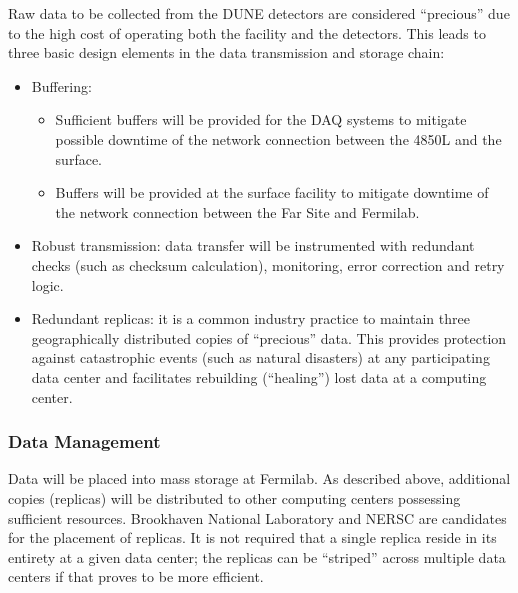 Raw data to be collected from the DUNE detectors are considered ``precious'' due to the high cost of operating both the facility and the detectors. %
This leads to three basic design elements in the data transmission and storage chain:
\begin{itemize}
\item Buffering:
\begin{itemize}
\item Sufficient %
buffers will be provided for the DAQ systems  to mitigate possible downtime of the network connection between the 4850L and the surface.
\item Buffers will be provided at the surface facility to mitigate downtime of the network connection between the Far Site and Fermilab.
\end{itemize}
\item Robust transmission: data transfer will %
be instrumented with redundant checks (such as checksum calculation), monitoring, error correction and retry logic.
\item Redundant replicas: it is a common industry practice to %
maintain three geographically distributed copies of ``precious'' data. %
This provides protection against catastrophic events (such as natural disasters) at any participating data center 
and facilitates rebuilding (``healing'')  lost data at a computing center.
\end{itemize}



\subsubsection{Data Management}
\label{sec:detectors-sc-infrastructure-computing-model-data-mgt}

Data will be placed into mass storage at Fermilab. As described above, additional copies (replicas) will be 
distributed to other computing centers possessing sufficient resources.
Brookhaven National Laboratory and NERSC are candidates for the placement of replicas.
It is not required that a single replica %
reside in its entirety at a given data center; the replicas can be ``striped'' across multiple data centers if that
proves to be more efficient.


